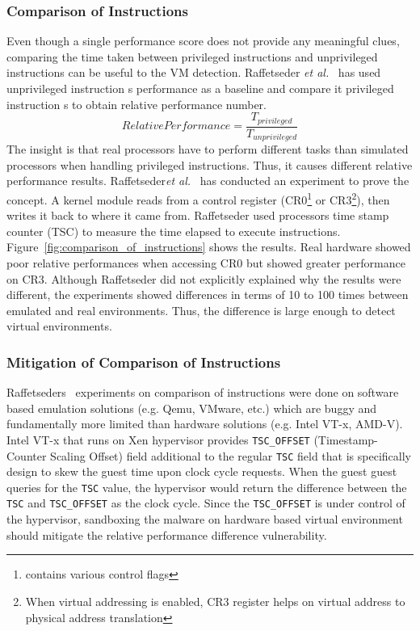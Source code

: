 \subsubsection{Comparison of Instructions}
Even though a single performance score does not provide any meaningful clues, comparing the time taken between privileged instructions and unprivileged instructions can be useful to the VM detection. Raffetseder {\em et al.}~\cite{raffetseder2007} has used unprivileged instruction \textquotesingle s performance as a baseline and compare it privileged instruction \textquotesingle s to obtain relative performance number.
\begin{equation*}
Relative Performance = \frac{T_{privileged}}{T_{unprivileged}}
\end{equation*}
The insight is that real processors have to perform different tasks than simulated processors when handling privileged instructions. Thus, it causes different relative performance results.  Raffetseder{\em et al.}~\cite{raffetseder2007} has conducted an experiment to prove the concept. A kernel module reads from a control register (CR0\footnote{contains various control flags} or CR3\footnote{When virtual addressing is enabled, CR3 register helps on virtual address to physical address translation}), then writes it back to where it came from. Raffetseder used processor\textquotesingle s time stamp counter (TSC) to measure the time elapsed to execute instructions. Figure~\ref{fig:comparison_of_instructions} shows the results. Real hardware showed poor relative performances when accessing CR0 but showed greater performance on CR3. Although Raffetseder did not explicitly explained why the results were different, the experiments showed differences in terms of 10 to 100 times between emulated and real environments. Thus, the difference is large enough to detect virtual environments.

\subsubsection{Mitigation of Comparison of Instructions} \label{sssec:mitigation_relative}
Raffetseder\textquotesingle s~\cite{raffetseder2007} experiments on comparison of instructions were done on software based emulation solutions (e.g. Qemu, VMware, etc.) which are buggy and fundamentally more limited than hardware solutions (e.g. Intel VT-x, AMD-V). Intel VT-x that runs on Xen hypervisor provides \texttt{TSC\_OFFSET} (Timestamp-Counter Scaling Offset) field additional to the regular  \texttt{TSC} field that is specifically design to skew the guest time upon clock cycle requests. When the guest guest queries for the \texttt{TSC} value, the hypervisor would return the difference between the \texttt{TSC} and \texttt{TSC\_OFFSET} as the clock cycle. Since the \texttt{TSC\_OFFSET} is under control of the hypervisor, sandboxing the malware on hardware based virtual environment should mitigate the relative performance difference vulnerability.

